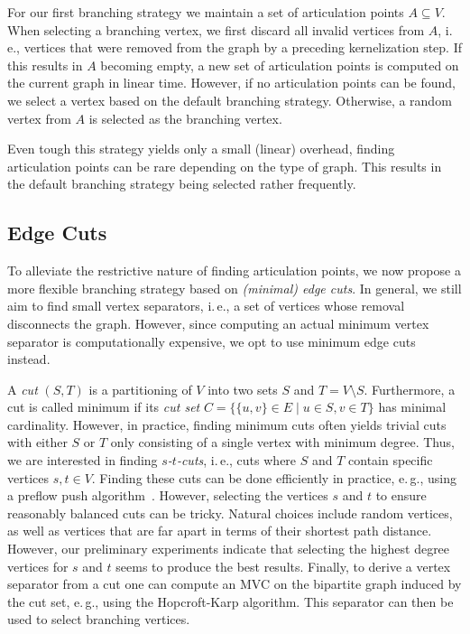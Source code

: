 \documentclass[a4paper,UKenglish,cleveref, autoref, thm-restate]{lipics-v2021}
\newcommand{\ie}{i.\,e.,\xspace}
\newcommand{\eg}{e.\,g.,\xspace}
\begin{document}
For our first branching strategy we maintain a set of articulation points $A \subseteq V$.
When selecting a branching vertex, we first discard all invalid vertices from $A$, \ie vertices that were removed from the graph by a preceding kernelization step.
If this results in $A$ becoming empty, a new set of articulation points is computed on the current graph in linear time.
However, if no articulation points can be found, we select a vertex based on the default branching strategy.
Otherwise, a random vertex from $A$ is selected as the branching
vertex.

Even tough this strategy yields only a small (linear) overhead, finding articulation points can be rare depending on the type of graph.
This results in the default branching strategy being selected rather
frequently.

\subsection{Edge Cuts}
To alleviate the restrictive nature of finding articulation points, we now propose a more flexible branching strategy based on \emph{(minimal) edge cuts}.
In general, we still aim to find small vertex separators, \ie a set of vertices whose removal disconnects the graph.
However, since computing an actual minimum vertex separator is computationally
expensive, we opt to use minimum edge cuts instead.

A \emph{cut} $(S,T)$ is a partitioning of $V$ into two sets $S$ and $T=V\setminus S$.
Furthermore, a cut is called minimum if its \emph{cut set} $C = \{\{u,v\} \in E \mid u \in S, v \in T\}$ has minimal cardinality.
However, in practice, finding minimum cuts often yields trivial cuts with either $S$ or $T$ only consisting of a single vertex with minimum degree. 
Thus, we are interested in finding \emph{$s$-$t$-cuts}, \ie cuts where $S$ and $T$ contain specific vertices $s,t \in V$.
Finding these cuts can be done efficiently in practice, \eg using a preflow push algorithm~\cite{goldberg1988new}.
However, selecting the vertices $s$ and $t$ to ensure reasonably balanced cuts can be tricky.
Natural choices include random vertices, as well as vertices that are far apart in terms of their shortest path distance.
However, our preliminary experiments indicate that selecting the highest degree
vertices for $s$ and $t$ seems to produce the best results.
Finally, to derive a vertex separator from a cut one can compute an MVC on the bipartite graph induced by the cut set, \eg using the Hopcroft-Karp algorithm.
This separator can then be used to select branching vertices.
\end{document}
